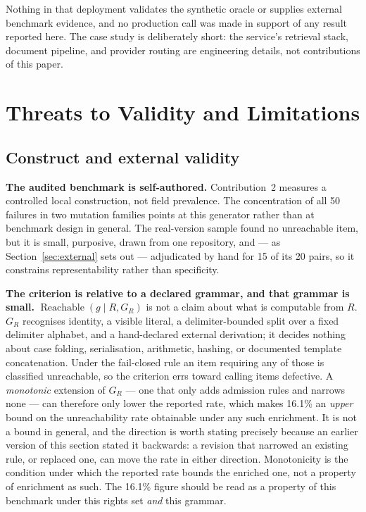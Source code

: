 \documentclass[11pt]{article}
\begin{document}
Nothing in that deployment validates the synthetic oracle or supplies external
benchmark evidence, and no production call was made in support of any result
reported here. The case study is deliberately short: the service's retrieval
stack, document pipeline, and provider routing are engineering details, not
contributions of this paper.

\section{Threats to Validity and Limitations}
\label{sec:limits}

\subsection{Construct and external validity}

\textbf{The audited benchmark is self-authored.} Contribution~2 measures a
controlled local construction, not field prevalence. The concentration of all
50 failures in two mutation families points at this generator rather than at
benchmark design in general. The real-version sample found no unreachable
item, but it is small, purposive, drawn from one repository, and --- as
Section~\ref{sec:external} sets out --- adjudicated by hand for 15 of its 20
pairs, so it constrains representability rather than specificity.

\textbf{The criterion is relative to a declared grammar, and that grammar is
small.} $\operatorname{Reachable}(g \mid R, G_R)$ is not a claim about what is
computable from $R$. $G_R$ recognises identity, a visible literal, a
delimiter-bounded split over a fixed delimiter alphabet, and a hand-declared
external derivation; it decides nothing about case folding, serialisation,
arithmetic, hashing, or documented template concatenation. Under the
fail-closed rule an item requiring any of those is classified unreachable, so
the criterion errs toward calling items defective. A \emph{monotonic}
extension of $G_R$ --- one that only adds admission rules and narrows none ---
can therefore only lower the reported rate, which makes 16.1\% an \emph{upper}
bound on the unreachability rate obtainable under any such enrichment. It is
not a bound in general, and the direction is worth stating precisely because an
earlier version of this section stated it backwards: a revision that narrowed
an existing rule, or replaced one, can move the rate in either direction.
Monotonicity is the condition under which the reported rate bounds the enriched
one, not a property of enrichment as such. The 16.1\% figure should be read as
a property of this benchmark under this rights set \emph{and} this grammar.
\end{document}

